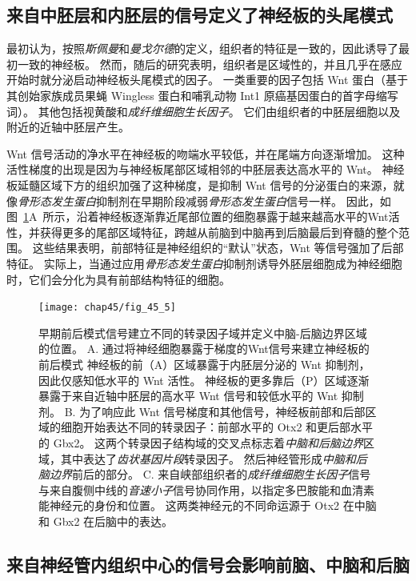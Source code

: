 \subsection{来自中胚层和内胚层的信号定义了神经板的头尾模式}

最初认为，按照\textit{斯佩曼}和\textit{曼戈尔德}的定义，组织者的特征是一致的，因此诱导了最初一致的神经板。
然而，随后的研究表明，组织者是区域性的，并且几乎在感应开始时就分泌启动神经板头尾模式的因子。
一类重要的因子包括 Wnt 蛋白（基于其创始家族成员果蝇 Wingless 蛋白和哺乳动物 Int1 原癌基因蛋白的首字母缩写词）。
其他包括视黄酸和\textit{成纤维细胞生长因子}。
它们由组织者的中胚层细胞以及附近的近轴中胚层产生。


Wnt 信号活动的净水平在神经板的吻端水平较低，并在尾端方向逐渐增加。
这种活性梯度的出现是因为与神经板尾部区域相邻的中胚层表达高水平的 Wnt。
神经板延髓区域下方的组织加强了这种梯度，是抑制 Wnt 信号的分泌蛋白的来源，就像\textit{骨形态发生蛋白}抑制剂在早期阶段减弱\textit{骨形态发生蛋白}信号一样。
因此，如图~\ref{fig:45_5}A~所示，沿着神经板逐渐靠近尾部位置的细胞暴露于越来越高水平的Wnt活性，并获得更多的尾部区域特征，跨越从前脑到中脑再到后脑最后到脊髓的整个范围。
这些结果表明，前部特征是神经组织的“默认”状态，Wnt 等信号强加了后部特征。
实际上，当通过应用\textit{骨形态发生蛋白}抑制剂诱导外胚层细胞成为神经细胞时，它们会分化为具有前部结构特征的细胞。


\begin{figure}[htbp]
	\centering
	\texttt{[image: chap45/fig\_45\_5]}
	\caption{早期前后模式信号建立不同的转录因子域并定义中脑-后脑边界区域的位置。
		A. 通过将神经细胞暴露于梯度的Wnt信号来建立神经板的前后模式
		神经板的前（A）区域暴露于内胚层分泌的 Wnt 抑制剂，因此仅感知低水平的 Wnt 活性。
		神经板的更多靠后（P）区域逐渐暴露于来自近轴中胚层的高水平 Wnt 信号和较低水平的 Wnt 抑制剂。
		B. 为了响应此 Wnt 信号梯度和其他信号，神经板前部和后部区域的细胞开始表达不同的转录因子：前部水平的 Otx2 和更后部水平的 Gbx2。
		这两个转录因子结构域的交叉点标志着\textit{中脑和后脑边界}区域，其中表达了\textit{齿状基因片段}转录因子。
		然后神经管形成\textit{中脑和后脑边界}前后的部分。
		C. 来自峡部组织者的\textit{成纤维细胞生长因子}信号与来自腹侧中线的\textit{音速小子}信号协同作用，以指定多巴胺能和血清素能神经元的身份和位置。
		这两类神经元的不同命运源于 Otx2 在中脑和 Gbx2 在后脑中的表达\cite{wurst2001neural}。}
	\label{fig:45_5}
\end{figure}



\subsection{来自神经管内组织中心的信号会影响前脑、中脑和后脑}

